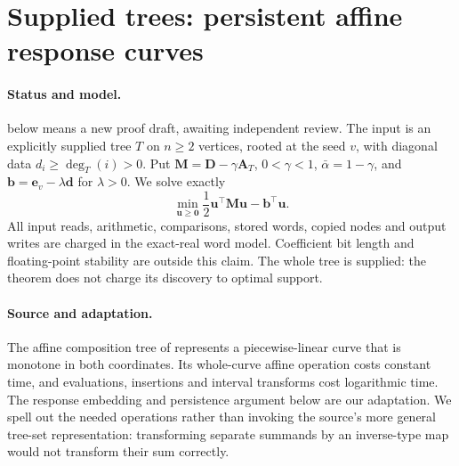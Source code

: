 \section{Supplied trees: persistent affine response curves}
\label{sec:op3-persistent-tree}

\paragraph{Status and model.}
\statusproved{} below means a new proof draft, awaiting independent review.
The input is an explicitly supplied tree $T$ on $n\geq2$ vertices, rooted at
the seed $v$, with diagonal data $d_i\geq\deg_T(i)>0$. Put
$\bm M=\bm D-\gamma\bm A_T$, $0<\gamma<1$, $\bar\alpha=1-\gamma$, and
$\bm b=\bm e_v-\lambda\bm d$ for $\lambda>0$. We solve exactly
\begin{equation}
 \min_{\bm u\geq\bm0}
 \frac12\bm u^\top\bm M\bm u-\bm b^\top\bm u.
 \label{eq:op3-tree-obstacle}
\end{equation}
All input reads, arithmetic, comparisons, stored words, copied nodes and
output writes are charged in the exact-real word model. Coefficient bit
length and floating-point stability are outside this claim. The whole tree
is supplied: the theorem does not charge its discovery to optimal support.

\paragraph{Source and adaptation.}
The affine composition tree of \citet[Section 3, Theorem 3.1]{agarwal2010act}
represents a piecewise-linear curve that is monotone in both coordinates.
Its whole-curve affine operation costs constant time, and evaluations,
insertions and interval transforms cost logarithmic time. The response
embedding and persistence argument below are our adaptation. We spell out
the needed operations rather than invoking the source's more general
tree-set representation: transforming separate summands by an inverse-type
map would not transform their sum correctly.

